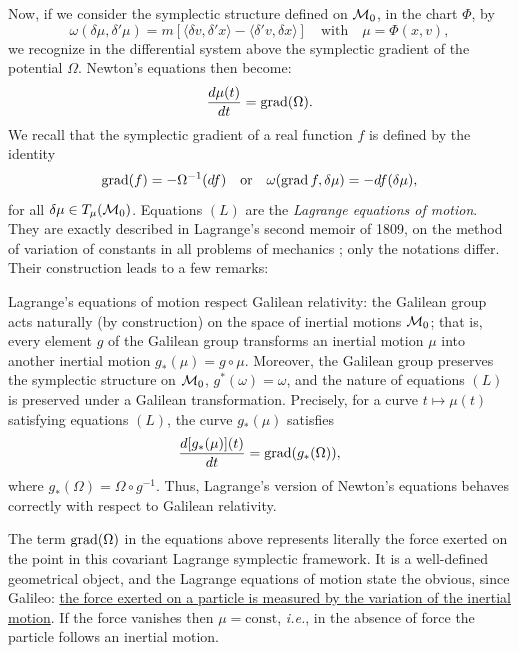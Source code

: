 Now, if we consider the symplectic structure defined on $\mathcal{M}_0$,
in the chart $\Phi$, by
\renewcommand{\theequation}{$\clubsuit$}
\begin{equation}
  \omega(\delta \mu,\delta'\mu) = m\left[\langle \delta v,\delta' x\rangle -
  \langle \delta' v,\delta x\rangle\right] \quad \text{with} \quad \mu = \Phi(x,v),
\end{equation}
we recognize in the differential system above the symplectic gradient of
the potential $\Omega$. Newton's equations then become:
\renewcommand{\theequation}{$L$}
\begin{equation}
  {d \mu(t) \over dt} = \operatorname{grad}(\Omega).
\end{equation}
We recall that the symplectic gradient of a real function $f$ is defined by the identity
$$
  \operatorname{grad}(f) = - \Omega^{-1}(df) \quad \text{or} \quad
  \omega(\operatorname{grad} f,\delta \mu) = -df(\delta \mu),
$$
for all $\delta \mu \in T_\mu(\mathcal{M}_0)$.
Equations $(L)$ are the {\em Lagrange equations of motion}. They
are exactly described in Lagrange's second memoir of 1809, on the
method of variation of constants in all problems of mechanics \cite{Lag09};
only the notations differ.
Their construction leads to a few remarks:

 Lagrange's equations of motion respect Galilean relativity:
the Galilean group acts naturally (by construction) on the space of inertial motions
$\mathcal{M}_0$; that is, every element $g$ of the Galilean group transforms an inertial motion
$\mu$ into another inertial motion $g_*(\mu) = g \circ \mu$. Moreover, the Galilean group
preserves the symplectic structure on $\mathcal{M}_0$, $g^*(\omega) = \omega$,
and the nature of equations $(L)$ is preserved under
a Galilean transformation. Precisely, for a curve $t \mapsto \mu(t)$ satisfying
equations $(L)$, the curve $g_*(\mu)$ satisfies
$$
  {d[g_*(\mu)](t) \over dt} = \operatorname{grad}(g_*(\Omega)),
$$
where $g_*(\Omega) = \Omega \circ g^{-1}$.
Thus, Lagrange's version of Newton's equations
behaves correctly with respect to Galilean relativity.

 The term $\operatorname{grad}(\Omega)$ in the equations above represents literally the force
exerted on the point in this covariant Lagrange symplectic framework.
It is a well-defined geometrical object, and the
Lagrange equations of motion state the obvious, since Galileo:
\uline{the force exerted on a particle is measured by the variation
of the inertial motion}.
If the force vanishes then $\mu = \text{const}$, \emph{i.e.}, in the absence of force the particle
follows an inertial motion.

